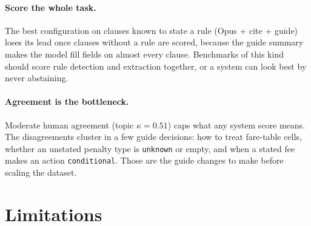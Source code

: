 \documentclass[11pt,a4paper]{article}
\begin{document}
\paragraph{Score the whole task.} The best configuration on clauses known to state a rule (Opus + cite + guide) loses its lead once clauses without a rule are scored, because the guide summary makes the model fill fields on almost every clause. Benchmarks of this kind should score rule detection and extraction together, or a system can look best by never abstaining.

\paragraph{Agreement is the bottleneck.} Moderate human agreement (topic $\kappa = 0.51$) caps what any system score means. The disagreements cluster in a few guide decisions: how to treat fare-table cells, whether an unstated penalty type is \texttt{unknown} or empty, and when a stated fee makes an action \texttt{conditional}. Those are the guide changes to make before scaling the dataset.

\section{Limitations}
\end{document}

